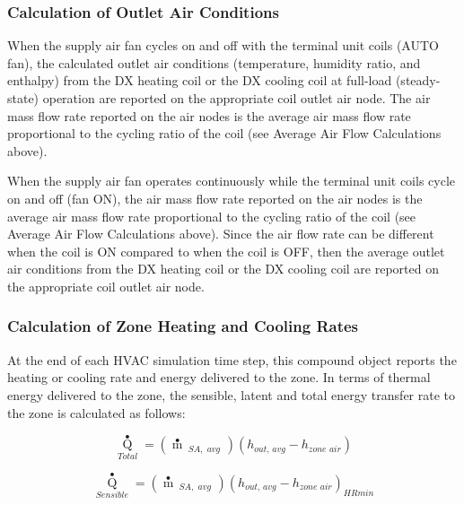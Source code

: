 \subsubsection{Calculation of Outlet Air Conditions}\label{calculation-of-outlet-air-conditions-2}

When the supply air fan cycles on and off with the terminal unit coils (AUTO fan), the calculated outlet air conditions (temperature, humidity ratio, and enthalpy) from the DX heating coil or the DX cooling coil at full-load (steady-state) operation are reported on the appropriate coil outlet air node. The air mass flow rate reported on the air nodes is the average air mass flow rate proportional to the cycling ratio of the coil (see Average Air Flow Calculations above).

When the supply air fan operates continuously while the terminal unit coils cycle on and off (fan ON), the air mass flow rate reported on the air nodes is the average air mass flow rate proportional to the cycling ratio of the coil (see Average Air Flow Calculations above). Since the air flow rate can be different when the coil is ON compared to when the coil is OFF, then the average outlet air conditions from the DX heating coil or the DX cooling coil are reported on the appropriate coil outlet air node.

\subsubsection{Calculation of Zone Heating and Cooling Rates}\label{calculation-of-zone-heating-and-cooling-rates-2}

At the end of each HVAC simulation time step, this compound object reports the heating or cooling rate and energy delivered to the zone. In terms of thermal energy delivered to the zone, the sensible, latent and total energy transfer rate to the zone is calculated as follows:

\begin{equation}
{\mathop Q\limits^ \bullet_{Total}} = \left( {\mathop m\limits^ \bullet  {\,_{SA,\,\,avg}}\,\,} \right)\left( {{h_{out,\,avg}} - {h_{zone\,\,air}}} \right)
\end{equation}

\begin{equation}
{\mathop Q\limits^ \bullet_{Sensible}} = \left( {\mathop m\limits^ \bullet  {\,_{SA,\,\,avg}}\,\,} \right){\left( {{h_{out,\,avg}} - {h_{zone\,\,air}}} \right)_{HRmin}}
\end{equation}


